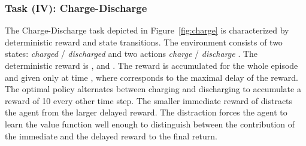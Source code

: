 \documentclass{article}
\begin{document}
\begin{appendices}
\begin{landscape}
\begin{table}[htp]
\begin{center}
\end{center}
\end{table}
\end{landscape}












\subsubsection{Task (IV): Charge-Discharge}
\label{sec:Acharge_discharge}
The Charge-Discharge task depicted in Figure~\ref{fig:charge}
is characterized by
deterministic reward and state transitions.
The environment consists of two states: 
{\em charged}  / {\em discharged}  
and two actions {\em charge}  / {\em discharge}
.
The deterministic reward is ,
and . 
The reward  is accumulated 
for the whole episode and given only at time ,
where  corresponds to the maximal delay of the reward.
The optimal policy alternates between charging and discharging
to accumulate a reward of 10 every other time step. 
The smaller immediate reward of  distracts the agent from 
the larger delayed reward. The distraction forces the agent to learn 
the value function well enough to distinguish between the contribution of the 
immediate and the delayed reward to the final return.  
\begin{figure}[htp]\centering {}
\end{figure}
\end{appendices}
\end{document}
